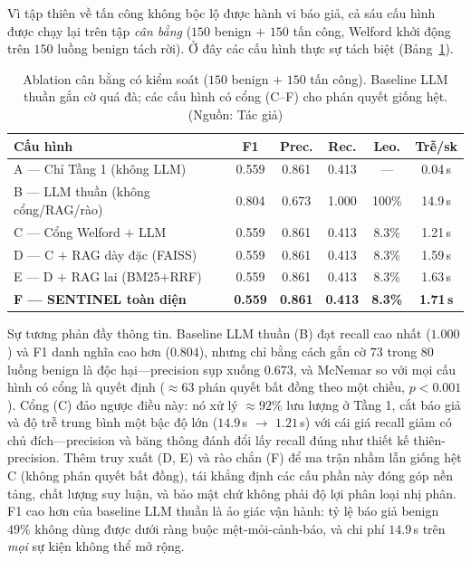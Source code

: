 Vì tập thiên về tấn công không bộc lộ được hành vi báo giả, cả sáu cấu hình được chạy lại trên tập \emph{cân bằng} ($150$ benign $+$ $150$ tấn công, Welford khởi động trên $150$ luồng benign tách rời). Ở đây các cấu hình thực sự tách biệt (Bảng~\ref{tab:ablation_balanced}).

\begin{table}[!htbp]
    \centering \footnotesize \setlength{\tabcolsep}{4pt}
    \caption{Ablation cân bằng có kiểm soát ($150$ benign $+$ $150$ tấn công). Baseline LLM thuần gắn cờ quá đà; các cấu hình có cổng (C--F) cho phán quyết giống hệt. (Nguồn: Tác giả)}
    \label{tab:ablation_balanced}
    \begin{tabular}{|>{\raggedright\arraybackslash}p{}|c|c|c|c|c|}
        \hline
        \textbf{Cấu hình} & \textbf{F1} & \textbf{Prec.} & \textbf{Rec.} & \textbf{Leo.} & \textbf{Trễ/sk} \\ \hline
        A --- Chỉ Tầng 1 (không LLM) & 0.559 & 0.861 & 0.413 & --- & 0.04\,s \\ \hline
        B --- LLM thuần (không cổng/RAG/rào) & 0.804 & 0.673 & 1.000 & 100\% & 14.9\,s \\ \hline
        C --- Cổng Welford $+$ LLM & 0.559 & 0.861 & 0.413 & 8.3\% & 1.21\,s \\ \hline
        D --- C $+$ RAG dày đặc (FAISS) & 0.559 & 0.861 & 0.413 & 8.3\% & 1.59\,s \\ \hline
        E --- D $+$ RAG lai (BM25$+$RRF) & 0.559 & 0.861 & 0.413 & 8.3\% & 1.63\,s \\ \hline
        \textbf{F --- SENTINEL toàn diện} & \textbf{0.559} & \textbf{0.861} & \textbf{0.413} & \textbf{8.3\%} & \textbf{1.71\,s} \\ \hline
    \end{tabular}
\end{table}

Sự tương phản đầy thông tin. Baseline LLM thuần (B) đạt recall cao nhất ($1.000$) và F1 danh nghĩa cao hơn ($0.804$), nhưng chỉ bằng cách gắn cờ $73$ trong $80$ luồng benign là độc hại---precision sụp xuống $0.673$, và McNemar so với mọi cấu hình có cổng là quyết định ($\approx\!63$ phán quyết bất đồng theo một chiều, $p<0.001$). Cổng (C) đảo ngược điều này: nó xử lý $\approx\!92\%$ lưu lượng ở Tầng 1, cắt báo giả và độ trễ trung bình một bậc độ lớn ($14.9$\,s $\rightarrow$ $1.21$\,s) với cái giá recall giảm có chủ đích---precision và băng thông đánh đổi lấy recall đúng như thiết kế thiên-precision. Thêm truy xuất (D, E) và rào chắn (F) để ma trận nhầm lẫn giống hệt C (không phán quyết bất đồng), tái khẳng định các cấu phần này đóng góp nền tảng, chất lượng suy luận, và bảo mật chứ không phải độ lợi phân loại nhị phân. F1 cao hơn của baseline LLM thuần là ảo giác vận hành: tỷ lệ báo giả benign $49\%$ không dùng được dưới ràng buộc mệt-mỏi-cảnh-báo, và chi phí $14.9$\,s trên \emph{mọi} sự kiện không thể mở rộng.


